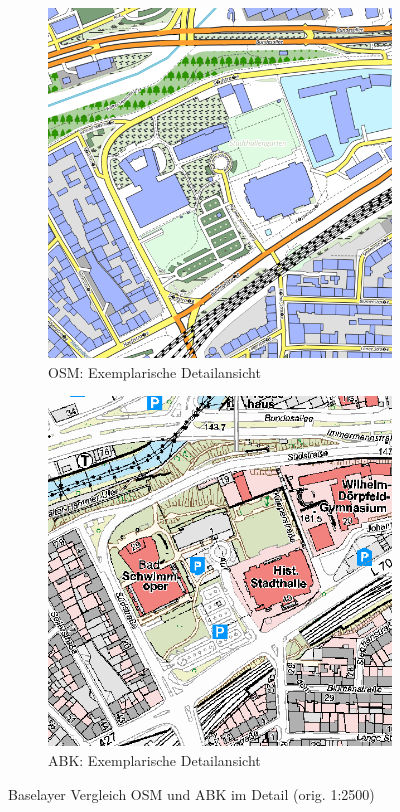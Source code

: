 		\begin{figure}[H]
			\begin{subfigure}{0.45\linewidth}
				\includegraphics[width=\linewidth]{Medien/own/qgis_baselayer_osm_detail.png}
				\caption{OSM: Exemplarische Detailansicht}
				\label{fig:qgis_baselayer_osm_detail}
			\end{subfigure}
			\begin{subfigure}{0.45\linewidth}
				\includegraphics[width=\linewidth]{Medien/own/qgis_baselayer_abk_detail.png}
				\caption{ABK: Exemplarische Detailansicht}
				\label{fig:qgis_baselayer_abk_detail}
			\end{subfigure}
			\caption{Baselayer Vergleich OSM und ABK im Detail (orig. 1:2500)}
			\label{fig:qgis_baselayer_compare_osm_abk_detail}
		\end{figure}	
	

